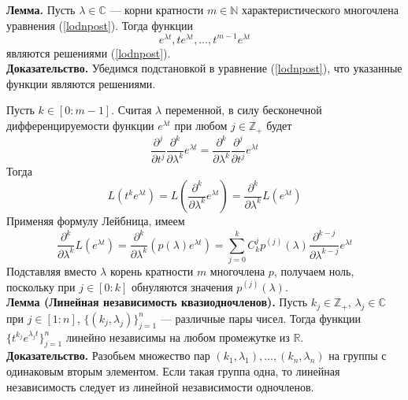 \documentclass{article}
\begin{document}
\noindent \textbf{Лемма.} Пусть $\lambda \in \mathbb{C}$ --- корни кратности $m \in \mathbb{N}$ характеристического многочлена уравнения (\ref{lodnpost}). Тогда функции
\begin{equation*}
    e^{\lambda t}, te^{\lambda t}, \ldots, t^{m-1}e^{\lambda t}
\end{equation*}
являются решениями (\ref{lodnpost}).\\

\noindent \textbf{Доказательство.} Убедимся подстановкой в уравнение (\ref{lodnpost}), что указанные функции являются решениями.

Пусть $k \in [0 : m-1]$. Считая $\lambda$ переменной, в силу бесконечной дифференцируемости функции $e^{\lambda t}$ при любом $j \in \mathbb{Z}_{+}$ будет
\begin{equation*}
    \frac{\partial^j}{\partial t^j}\frac{\partial^k}{\partial \lambda^k}e^{\lambda t} = \frac{\partial^k}{\partial\lambda^k}\frac{\partial^j}{\partial t^j}e^{\lambda t}
\end{equation*}
Тогда
\begin{equation*}
    L(t^ke^{\lambda t}) = L\left(\frac{\partial^k}{\partial\lambda^k}e^{\lambda t} \right) = \frac{\partial^k}{\partial\lambda^k}L(e^{\lambda t})
\end{equation*}
Применяя формулу Лейбница, имеем
\begin{equation*}
    \frac{\partial^k}{\partial\lambda^k}L(e^{\lambda t}) = \frac{\partial^k}{\partial\lambda^k} (p(\lambda)e^{\lambda t}) = \sum_{j = 0}^k C_k^j p^{(j)}(\lambda)\frac{\partial^{k - j}}{\partial\lambda^{k - j}} e^{\lambda t}
\end{equation*}
Подставляя вместо $\lambda$ корень кратности $m$ многочлена $p$, получаем ноль, поскольку при $j \in [0 : k]$ обнуляются значения $p^{(j)}(\lambda)$.\\

\noindent \textbf{Лемма (Линейная независимость квазиодночленов).} Пусть $k_j \in \mathbb{Z}_{+}$, $\lambda_j \in \mathbb{C}$ при $j \in [1 : n]$, $\{(k_j,\lambda_j)\}_{j=1}^n$ --- различные пары чисел. Тогда функции $\{t^{k_j}e^{\lambda_jt}\}_{j=1}^n$ линейно независимы на любом промежутке из $\mathbb{R}$.\\

\noindent \textbf{Доказательство.} Разобьем множество пар $(k_1, \lambda_1), \ldots, (k_n, \lambda_n)$ на группы с одинаковым вторым элементом. Если такая группа одна, то линейная независимость следует из линейной независимости одночленов.
\end{document}
